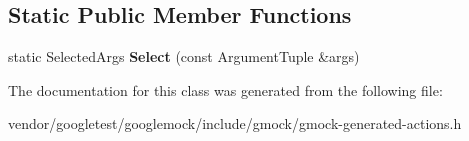\subsection*{Static Public Member Functions}
\begin{DoxyCompactItemize}
\item 
static Selected\+Args {\bfseries Select} (const Argument\+Tuple \&args)\hypertarget{classtesting_1_1internal_1_1SelectArgs_3_01Result_00_01ArgumentTuple_00_01k1_00_01k2_00_01k3_00_d8106922b84b5ce2491b61ffee01e097_a8521db3b77ca57c380be1adef0e2cfc8}{}\label{classtesting_1_1internal_1_1SelectArgs_3_01Result_00_01ArgumentTuple_00_01k1_00_01k2_00_01k3_00_d8106922b84b5ce2491b61ffee01e097_a8521db3b77ca57c380be1adef0e2cfc8}

\end{DoxyCompactItemize}


The documentation for this class was generated from the following file\+:\begin{DoxyCompactItemize}
\item 
vendor/googletest/googlemock/include/gmock/gmock-\/generated-\/actions.\+h\end{DoxyCompactItemize}
